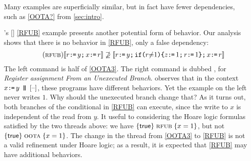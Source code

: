 
Many examples are superficially similar, but in fact have fewer dependencies,
such as \eqref{OOTA?} from \textsection\ref{sec:intro}.

\citeauthor{BoehmOOTA}'s [\citeyear{BoehmOOTA}] \ref{RFUB} example presents
another potential form of \oota{} behavior.
Our analysis shows that there is no \oota{} behavior in
\ref{RFUB}, only a false dependency:
\begin{gather*}
  \tag{\textsc{rfub}}\label{RFUB}
  \sem{r\GETS y\SEMI x\GETS r}
  \not\supseteq
  \sem{r\GETS y\SEMI \IF{r \NOTEQ 1} \THEN z\GETS 1\SEMI r\GETS 1\FI \SEMI x\GETS r}
\end{gather*}
The left command is half of \ref{OOTA3}. %
The right command is dubbed \rfub{}, for \emph{Register assignment From an
  Unexecuted Branch}.  \citeauthor{BoehmOOTA} observes that in the context
$x\GETS y \PAR \hole{}$, these programs have different behaviors.  Yet the
\oota{} example on the left never writes $1$.  Why should the unexecuted
branch change that?  As it turns out, both branches of the conditional in
\ref{RFUB} can execute, since the write to $x$ is independent of the read
from $y$.  It useful to considering the Hoare logic formulas satisfied by the
two threads above: we have $\{\mathsf{true}\}\allowbreak\;\text{{\sc rfub}}\;\allowbreak\{x=1\}$, but not
$\{\mathsf{true}\}\allowbreak\;\text{{\sc oota}}\;\allowbreak\{x=1\}$.  The change in the thread from
\ref{OOTA3} to \ref{RFUB} is not a valid refinement under Hoare logic; as a
result, it is expected that \ref{RFUB} may have additional behaviors.

